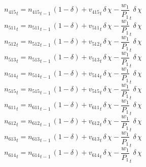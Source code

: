 \begin{dmath}
{{n_{415}}}_{t}={{n_{415}}}_{t-1}\, \left(1-{{\delta}}\right)+{{v_{415}}}_{t}\, {{\delta}}\, {{\chi}}-{{\frac{w_{1}}{P_{1}}}}_{t}\, {{\delta}}\, {{\chi}}
\end{dmath}
\begin{dmath}
{{n_{511}}}_{t}={{n_{511}}}_{t-1}\, \left(1-{{\delta}}\right)+{{v_{511}}}_{t}\, {{\delta}}\, {{\chi}}-{{\frac{w_{1}}{P_{1}}}}_{t}\, {{\delta}}\, {{\chi}}
\end{dmath}
\begin{dmath}
{{n_{512}}}_{t}={{n_{512}}}_{t-1}\, \left(1-{{\delta}}\right)+{{v_{512}}}_{t}\, {{\delta}}\, {{\chi}}-{{\frac{w_{1}}{P_{1}}}}_{t}\, {{\delta}}\, {{\chi}}
\end{dmath}
\begin{dmath}
{{n_{513}}}_{t}={{n_{513}}}_{t-1}\, \left(1-{{\delta}}\right)+{{v_{513}}}_{t}\, {{\delta}}\, {{\chi}}-{{\frac{w_{1}}{P_{1}}}}_{t}\, {{\delta}}\, {{\chi}}
\end{dmath}
\begin{dmath}
{{n_{514}}}_{t}={{n_{514}}}_{t-1}\, \left(1-{{\delta}}\right)+{{v_{514}}}_{t}\, {{\delta}}\, {{\chi}}-{{\frac{w_{1}}{P_{1}}}}_{t}\, {{\delta}}\, {{\chi}}
\end{dmath}
\begin{dmath}
{{n_{515}}}_{t}={{n_{515}}}_{t-1}\, \left(1-{{\delta}}\right)+{{v_{515}}}_{t}\, {{\delta}}\, {{\chi}}-{{\frac{w_{1}}{P_{1}}}}_{t}\, {{\delta}}\, {{\chi}}
\end{dmath}
\begin{dmath}
{{n_{611}}}_{t}={{n_{611}}}_{t-1}\, \left(1-{{\delta}}\right)+{{v_{611}}}_{t}\, {{\delta}}\, {{\chi}}-{{\frac{w_{1}}{P_{1}}}}_{t}\, {{\delta}}\, {{\chi}}
\end{dmath}
\begin{dmath}
{{n_{612}}}_{t}={{n_{612}}}_{t-1}\, \left(1-{{\delta}}\right)+{{v_{612}}}_{t}\, {{\delta}}\, {{\chi}}-{{\frac{w_{1}}{P_{1}}}}_{t}\, {{\delta}}\, {{\chi}}
\end{dmath}
\begin{dmath}
{{n_{613}}}_{t}={{n_{613}}}_{t-1}\, \left(1-{{\delta}}\right)+{{v_{613}}}_{t}\, {{\delta}}\, {{\chi}}-{{\frac{w_{1}}{P_{1}}}}_{t}\, {{\delta}}\, {{\chi}}
\end{dmath}
\begin{dmath}
{{n_{614}}}_{t}={{n_{614}}}_{t-1}\, \left(1-{{\delta}}\right)+{{v_{614}}}_{t}\, {{\delta}}\, {{\chi}}-{{\frac{w_{1}}{P_{1}}}}_{t}\, {{\delta}}\, {{\chi}}
\end{dmath}
